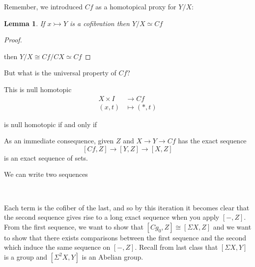 \documentclass[12pt]{article}
\newtheorem{lemma}[theorem]{Lemma}
\theoremstyle{definition}
\begin{document}
	Remember, we introduced $Cf$ as a homotopical proxy for $Y/X$:
	
	\begin{lemma}{1}
		If $x\rightarrowtail Y$ is a cofibration then $Y/X\simeq Cf$
	\end{lemma}
	\begin{proof}
		\begin{center}
		\end{center}
		then $Y/X\cong Cf/CX\simeq Cf$
	\end{proof}
	
	But what is the universal property of $Cf$? \begin{center}
	\end{center}
	This is null homotopic \begin{equation*}
	\begin{split}
	X\times I &\to Cf\\
	(x,t)&\mapsto (\ast,t)
	\end{split}
	\end{equation*}
	
	\begin{center}
		is null homotopic if and only if \
	\end{center}
	As an immediate consequence, given $Z$ and $X\to Y \to Cf$ has the exact sequence \[
	[Cf,Z]\to [Y,Z]\to [X,Z]
	\]
	is an exact sequence of sets. 
	
	We can write two sequences
	\begin{center}
		\\
	\end{center}
	Each term is the cofiber of the last, and so by this iteration it becomes clear that the second sequence gives rise to a long exact sequence when you apply $[-,Z]$. From the first sequence, we want to show that $[Cg_0,Z]\cong [\Sigma X,Z]$ and we want to show that there exists comparisons between the first sequence and the second which induce the same sequence on $[-,Z]$. Recall from last class that $[\Sigma X,Y]$ is a group and $[\Sigma^2 X,Y]$ is an Abelian group. 
	
\end{document}
